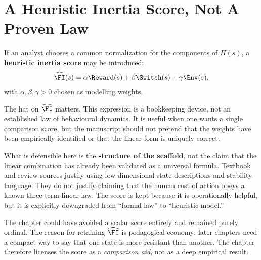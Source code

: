 \section{A Heuristic Inertia Score, Not A Proven Law}

\begin{definition}
If an analyst chooses a common normalization for the components of
$\Pi(s)$, a \textbf{heuristic inertia score} may be introduced:
\[
  \widehat{\FI}(s) = \alpha \Reward(s) + \beta \Switch(s) + \gamma \Env(s),
\]
with $\alpha,\beta,\gamma > 0$ chosen as modelling weights.
\end{definition}

\begin{remark}
The hat on $\widehat{\FI}$ matters. This expression is a bookkeeping device,
not an established law of behavioural dynamics. It is useful when one wants a
single comparison score, but the manuscript should not pretend that the weights
have been empirically identified or that the linear form is uniquely correct.
\end{remark}

\begin{discussion}
What is defensible here is the \textbf{structure of the scaffold}, not the
claim that the linear combination has already been validated as a universal
formula. Textbook and review sources justify using low-dimensional state
descriptions and stability language. They do not justify claiming that the
human cost of action obeys a known three-term linear law. The score is kept
because it is operationally helpful, but it is explicitly downgraded from
``formal law'' to ``heuristic model.''
\end{discussion}

\begin{remark}
The chapter could have avoided a scalar score entirely and remained purely
ordinal. The reason for retaining $\widehat{\FI}$ is pedagogical economy: later
chapters need a compact way to say that one state is more resistant than
another. The chapter therefore licenses the score as a \emph{comparison aid},
not as a deep empirical result.
\end{remark}
